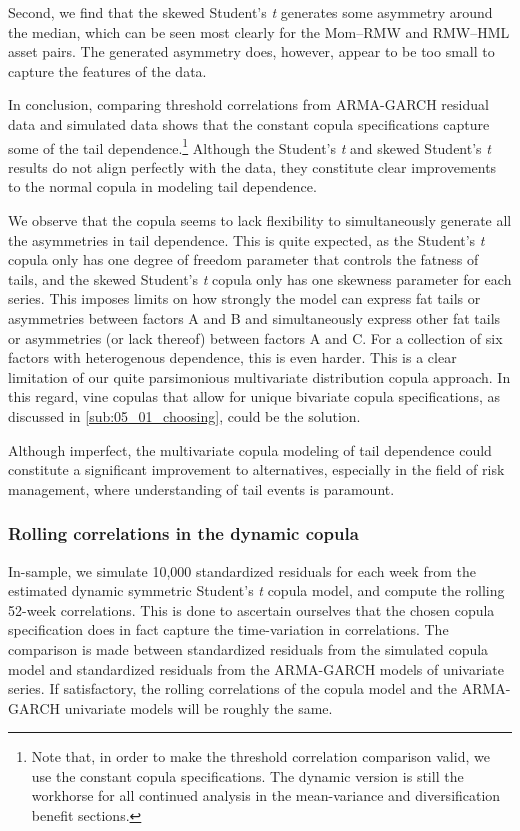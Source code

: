 Second, we find that the skewed Student's \textit{t} generates some asymmetry around the median, which can be seen most clearly for the Mom--RMW and RMW--HML asset pairs. The generated asymmetry does, however, appear to be too small to capture the features of the data.

In conclusion, comparing threshold correlations from ARMA-GARCH residual data and simulated data shows that the constant copula specifications capture some of the tail dependence.\footnote{Note that, in order to make the threshold correlation comparison valid, we use the constant copula specifications. The dynamic version is still the workhorse for all continued analysis in the mean-variance and diversification benefit sections.} Although the Student's \textit{t} and skewed Student's \textit{t} results do not align perfectly with the data, they constitute clear improvements to the normal copula in modeling tail dependence. 

We observe that the copula seems to lack flexibility to simultaneously generate all the asymmetries in tail dependence. This is quite expected, as the Student's \textit{t} copula only has one degree of freedom parameter that controls the fatness of tails, and the skewed Student's \textit{t} copula only has one skewness parameter for each series. This imposes limits on how strongly the model can express fat tails or asymmetries between factors A and B and simultaneously express other fat tails or asymmetries (or lack thereof) between factors A and C. For a collection of six factors with heterogenous dependence, this is even harder. This is a clear limitation of our quite parsimonious multivariate distribution copula approach. In this regard, vine copulas that allow for unique bivariate copula specifications, as discussed in \autoref{sub:05_01_choosing}, could be the solution.

Although imperfect, the multivariate copula modeling of tail dependence could constitute a significant improvement to alternatives, especially in the field of risk management, where understanding of tail events is paramount.

\subsubsection{Rolling correlations in the dynamic copula}

In-sample, we simulate 10,000 standardized residuals for each week from the estimated dynamic symmetric Student's \textit{t} copula model, and compute the rolling 52-week correlations. This is done to ascertain ourselves that the chosen copula specification does in fact capture the time-variation in correlations. The comparison is made between standardized residuals from the simulated copula model and standardized residuals from the ARMA-GARCH models of univariate series. If satisfactory, the rolling correlations of the copula model and the ARMA-GARCH univariate models will be roughly the same.

